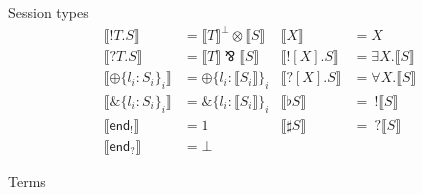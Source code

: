 \documentclass{easychair}
\newcommand{\key}{\mathsf}
\newcommand{\set}[1]{\{ #1 \}}
\newcommand{\row}[2]{\set{#1}_{#2}}
\newcommand{\gvOutput}[2]{\mathord{!}{#1}.{#2}}
\newcommand{\gvInput}[2]{\mathord{?}{#1}.{#2}}
\newcommand{\gvEndOutput}{\key{end}_!}
\newcommand{\gvEndInput}{\key{end}_?}
\newcommand{\gvPlus}[2]{\oplus \row{#1}{#2}}
\newcommand{\gvChoice}[2]{\binampersand \row{#1}{#2}}
\newcommand{\gvServer}[1]{\flat {#1}}
\newcommand{\gvService}[1]{\sharp {#1}}
\newcommand{\gvOutputType}[2]{![{#1}].{#2}}
\newcommand{\gvInputType}[2]{?[{#1}].{#2}}
\newcommand{\la}{l}
\newcommand{\cpTimes}[2]{{#1} \otimes {#2}}
\newcommand{\cpPar}[2]{{#1} \mathbin{\bindnasrepma} {#2}}
\newcommand{\cpPlus}[2]{\oplus \row{#1}{#2}}
\newcommand{\cpWith}[2]{\binampersand \row{#1}{#2}}
\newcommand{\cpOne}{1}
\newcommand{\cpBottom}{\bot}
\newcommand{\cpOfCourse}[1]{!{#1}}
\newcommand{\cpWhyNot}[1]{?{#1}}
\newcommand{\cpDual}[1]{{#1}^\bot}
\newcommand{\cpExists}[2]{\exists {#1}.{#2}}
\newcommand{\cpForall}[2]{\forall {#1}.{#2}}
\newcommand{\hgvcp}[1]{\llbracket{#1}\rrbracket}
\begin{document}
Session types
\begin{align*}
\hgvcp{\gvOutput{T}{S}}        &= \cpTimes{\cpDual{\hgvcp{T}}}{\hgvcp{S}} & \hgvcp{X}                       &= X \\
\hgvcp{\gvInput{T}{S}}         &= \cpPar{\hgvcp{T}}{\hgvcp{S}} & \hgvcp{\gvOutputType{X}{S}}     &= \cpExists{X}{\hgvcp{S}} \\
\hgvcp{\gvPlus{\la_i:S_i}{i}}   &= \cpPlus{\la_i:\hgvcp{S_i}}{i} & \hgvcp{\gvInputType{X}{S}}      &= \cpForall{X}{\hgvcp{S}} \\
\hgvcp{\gvChoice{\la_i:S_i}{i}} &= \cpWith{\la_i:\hgvcp{S_i}}{i} & \hgvcp{\gvServer{S}}  &=\: \cpOfCourse{\hgvcp{S}} \\
\hgvcp{\gvEndOutput}              &= \cpOne & \hgvcp{\gvService{S}} &= \: \cpWhyNot{\hgvcp{S}} \\
\hgvcp{\gvEndInput}               &= \cpBottom
\end{align*}

Terms

\newcommand{\hgvcpl}{\left\llbracket}
\newcommand{\hgvcpr}{\right\rrbracket}
\end{document}

